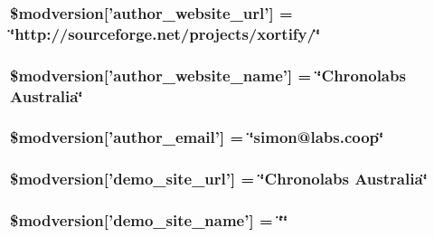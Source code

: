 \hypertarget{xoops__version_8php_aa4e12581579c2367973edde1bb88501b}{
\subsubsection[{\$modversion}]{\setlength{\rightskip}{0pt plus 5cm}\$modversion\mbox{[}'author\-\_\-website\-\_\-url'\mbox{]} = \char`\"{}http\-://sourceforge.\-net/projects/xortify/\char`\"{}}}\label{xoops__version_8php_aa4e12581579c2367973edde1bb88501b}
\hypertarget{xoops__version_8php_a46166b6a7758f2db961ddfc222c7cee7}{
\subsubsection[{\$modversion}]{\setlength{\rightskip}{0pt plus 5cm}\$modversion\mbox{[}'author\-\_\-website\-\_\-name'\mbox{]} = \char`\"{}Chronolabs Australia\char`\"{}}}\label{xoops__version_8php_a46166b6a7758f2db961ddfc222c7cee7}
\hypertarget{xoops__version_8php_ab54848746dffc89a9586849773c37117}{
\subsubsection[{\$modversion}]{\setlength{\rightskip}{0pt plus 5cm}\$modversion\mbox{[}'author\-\_\-email'\mbox{]} = \char`\"{}simon@labs.\-coop\char`\"{}}}\label{xoops__version_8php_ab54848746dffc89a9586849773c37117}
\hypertarget{xoops__version_8php_ac4ba86acfbe5315b02336ae5b1bfda08}{
\subsubsection[{\$modversion}]{\setlength{\rightskip}{0pt plus 5cm}\$modversion\mbox{[}'demo\-\_\-site\-\_\-url'\mbox{]} = \char`\"{}Chronolabs Australia\char`\"{}}}\label{xoops__version_8php_ac4ba86acfbe5315b02336ae5b1bfda08}
\hypertarget{xoops__version_8php_a791eeaa88e332857d66106842bea8dbe}{
\subsubsection[{\$modversion}]{\setlength{\rightskip}{0pt plus 5cm}\$modversion\mbox{[}'demo\-\_\-site\-\_\-name'\mbox{]} = \char`\"{}\char`\"{}}}\label{xoops__version_8php_a791eeaa88e332857d66106842bea8dbe}
